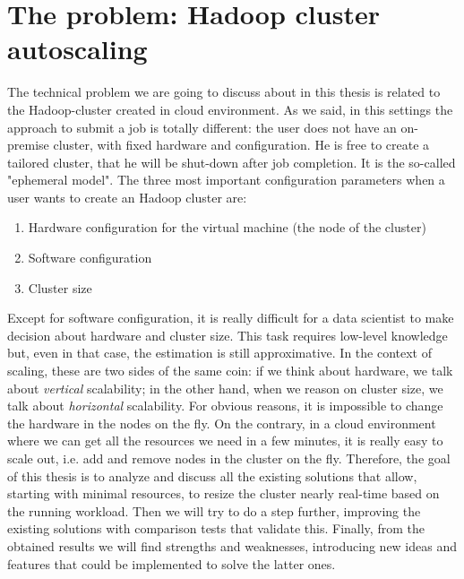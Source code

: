 \documentclass[12pt,twoside,cucitura]{toptesi}
\begin{document}
\section{The problem: Hadoop cluster autoscaling}
The technical problem we are going to discuss about in this thesis is related to the Hadoop-cluster created in cloud environment. As we said, in this settings the approach to submit a job is totally different: the user does not have an on-premise cluster, with fixed hardware and configuration. He is free to create a tailored cluster, that he will be shut-down after job completion. It is the so-called "ephemeral model". The three most important configuration parameters when a user wants to create an Hadoop cluster are:
\begin{enumerate}
  \item Hardware configuration for the virtual machine (the node of the cluster)
  \item Software configuration
  \item Cluster size
\end{enumerate}

Except for software configuration, it is really difficult for a data scientist to make decision about hardware and cluster size. This task requires low-level knowledge but, even in that case, the estimation is still approximative. In the context of scaling, these are two sides of the same coin: if we think about hardware, we talk about \textit{vertical} scalability; in the other hand, when we reason on cluster size, we talk about \textit{horizontal} scalability. For obvious reasons, it is impossible to change the hardware in the nodes on the fly. On the contrary, in a cloud environment where we can get all the resources we need in a few minutes, it is really easy to scale out, i.e. add and remove nodes in the cluster on the fly. Therefore, the goal of this thesis is to analyze and discuss all the existing solutions that allow, starting with minimal resources, to resize the cluster nearly real-time based on the running workload. Then we will try to do a step further, improving the existing solutions with comparison tests that validate this. Finally, from the obtained results we will find strengths and weaknesses, introducing new ideas and features that could be implemented to solve the latter ones.
\end{document}
